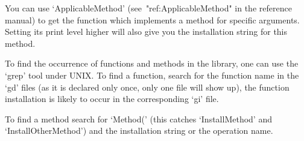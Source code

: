You can use `ApplicableMethod' (see~"ref:ApplicableMethod" in the reference
manual) to get the function which implements a method for specific
arguments. Setting its print level higher will also give you the
installation string for this method.

To find the occurrence of functions and methods in the library, one can use
the `grep' tool under UNIX. To find a function, search for the function name
in the `gd' files (as it is declared only once, only one file will show up),
the function installation is likely to occur in the corresponding `gi' file.

To find a method search for `Method(' (this catches `InstallMethod' and
`InstallOtherMethod') and the installation string or the operation name.


